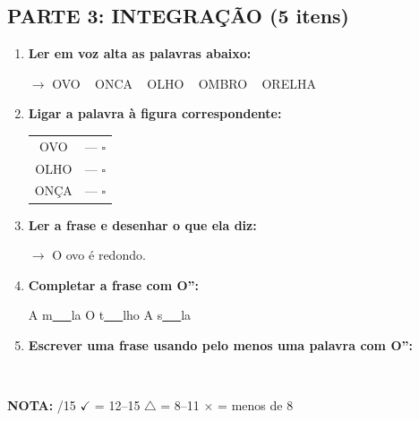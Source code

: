 \begin{exercicio}
\subsection*{PARTE 3: INTEGRAÇÃO (5 itens)}

\begin{enumerate}[resume]
  \item \textbf{Ler em voz alta as palavras abaixo:}
  \begin{center}
  $\rightarrow$ OVO  ~  ONCA  ~  OLHO  ~  OMBRO  ~  ORELHA
  \end{center}

  \item \textbf{Ligar a palavra à figura correspondente:}
  \begin{center}
  \begin{tabular}{cc}
  OVO & \quad --- \quad $\square$ \\
  OLHO & \quad --- \quad $\square$ \\
  ONÇA & \quad --- \quad $\square$
  \end{tabular}
  \end{center}

  \item \textbf{Ler a frase e desenhar o que ela diz:}
  \begin{center}
  $\rightarrow$ O ovo é redondo.
  \end{center}
  \begin{center}
  \end{center}

  \item \textbf{Completar a frase com O'':}
  \begin{center}
  A m\underline{~~~}la \quad O t\underline{~~~}lho \quad A s\underline{~~~}la
  \end{center}

  \item \textbf{Escrever uma frase usando pelo menos uma palavra com O'':}
  \begin{center}
  \underline{\hspace{12cm}} \\
  \underline{\hspace{12cm}}
  \end{center}
\end{enumerate}

\noindent\textbf{NOTA:} \underline{\hspace{1cm}}/15 \quad $\checkmark$ = 12--15 \quad $\triangle$ = 8--11 \quad $\times$ = menos de 8
\end{exercicio}

